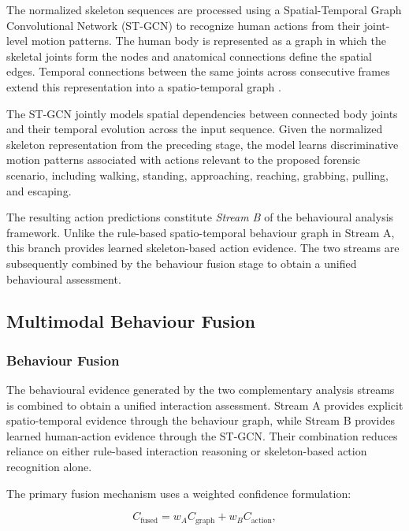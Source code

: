 \documentclass[conference]{IEEEtran}
\begin{document}
The normalized skeleton sequences are processed using a Spatial-Temporal
Graph Convolutional Network (ST-GCN) \cite{yan2018stgcn} to recognize human actions from
their joint-level motion patterns. The human body is represented as a
graph in which the skeletal joints form the nodes and anatomical
connections define the spatial edges. Temporal connections between the
same joints across consecutive frames extend this representation into a
spatio-temporal graph \cite{yan2018stgcn}.

The ST-GCN jointly models spatial dependencies between connected body
joints and their temporal evolution across the input sequence. Given the
normalized skeleton representation from the preceding stage, the model
learns discriminative motion patterns associated with actions relevant
to the proposed forensic scenario, including walking, standing,
approaching, reaching, grabbing, pulling, and escaping.

The resulting action predictions constitute \textit{Stream B} of the
behavioural analysis framework. Unlike the rule-based spatio-temporal
behaviour graph in Stream A, this branch provides learned
skeleton-based action evidence. The two streams are subsequently
combined by the behaviour fusion stage to obtain a unified behavioural
assessment.

\subsection{Multimodal Behaviour Fusion}

\subsubsection{Behaviour Fusion}

The behavioural evidence generated by the two complementary analysis
streams is combined to obtain a unified interaction assessment. Stream A
provides explicit spatio-temporal evidence through the behaviour graph,
while Stream B provides learned human-action evidence through the
ST-GCN. Their combination reduces reliance on either rule-based
interaction reasoning or skeleton-based action recognition alone.

The primary fusion mechanism uses a weighted confidence formulation:

\begin{equation}
C_{\mathrm{fused}} =
w_A C_{\mathrm{graph}} +
w_B C_{\mathrm{action}},
\end{equation}
\end{document}
